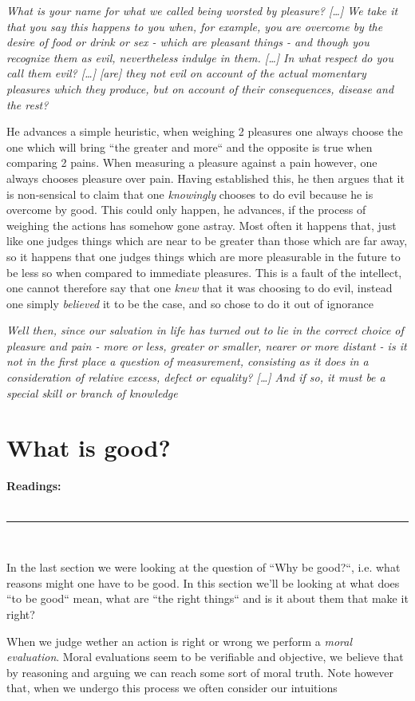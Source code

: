 \documentclass[english,course]{Notes}
\newcommand{\ita}[1]{\textit{#1}}
\newcommand\readings{\textbf{Readings:} \\}
\newcommand\sep{\\ \noindent\rule{10cm}{0.8pt} \\}
\newcommand\quo[1]{\begin{displayquote}\ita{\large{#1}}\end{displayquote}}
\begin{document}
{{\quo{What is your name for what we called being worsted by pleasure? [\dots] We take it that you say this happens to you when, for example, you are overcome by the desire of food or drink or sex - which are pleasant things - and though you recognize them as evil, nevertheless indulge in them. [\dots] In what respect do you call them evil? [\dots] [are] they not evil on account of the actual momentary pleasures which they produce, but on account of their consequences, disease and the rest?}

\par{He advances a simple heuristic, when weighing 2 pleasures one always choose the one which will bring ``the greater and more`` and the opposite is true when comparing 2 pains. When measuring a pleasure against a pain however, one always chooses pleasure over pain. Having established this, he then argues that it is non-sensical to claim that one \ita{knowingly} chooses to do evil because he is overcome by good. This could only happen, he advances, if the process of weighing the actions has somehow gone astray. Most often it happens that, just like one judges things which are near to be greater than those which are far away, so it happens that one judges things which are more pleasurable in the future to be less so when compared to immediate pleasures. This is a fault of the intellect, one cannot therefore say that one \ita{knew} that it was choosing to do evil, instead one simply \ita{believed} it to be the case, and so chose to do it out of ignorance}
\newpage
\quo{Well then, since our salvation in life has turned out to lie in the correct choice of pleasure and pain - more or less, greater or smaller, nearer or more distant - is it not in the first place a question of measurement, consisting as it does in a consideration of relative excess, defect or equality? [\dots] And if so, it must be a special skill or branch of knowledge}

\newpage

\section{What is good?}

\readings \cite[Chapter 2]{driver_2014} 
\sep

\par{In the last section we were looking at the question of ``Why be good?``, i.e. what reasons might one have to be good. In this section we'll be looking at what does ``to be good`` mean, what are ``the right things`` and is it about them that make it right?}
\par{ When we judge wether an action is right or wrong we perform a \ita{moral evaluation}. Moral evaluations seem to be verifiable and objective, we believe that by reasoning and arguing we can reach some sort of moral truth. Note however that, when we undergo this process we often consider our intuitions}

}}
\end{document}
